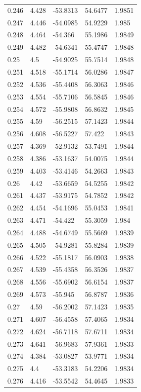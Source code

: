 \begin{tabular}{lllll}
0.246 & 4.428 & -53.8313 & 54.6477 & 1.9851 \\
0.247 & 4.446 & -54.0985 & 54.9229 & 1.985 \\
0.248 & 4.464 & -54.366 & 55.1986 & 1.9849 \\
0.249 & 4.482 & -54.6341 & 55.4747 & 1.9848 \\
0.25 & 4.5 & -54.9025 & 55.7514 & 1.9848 \\
0.251 & 4.518 & -55.1714 & 56.0286 & 1.9847 \\
0.252 & 4.536 & -55.4408 & 56.3063 & 1.9846 \\
0.253 & 4.554 & -55.7106 & 56.5845 & 1.9846 \\
0.254 & 4.572 & -55.9808 & 56.8632 & 1.9845 \\
0.255 & 4.59 & -56.2515 & 57.1423 & 1.9844 \\
0.256 & 4.608 & -56.5227 & 57.422 & 1.9843 \\
0.257 & 4.369 & -52.9132 & 53.7491 & 1.9844 \\
0.258 & 4.386 & -53.1637 & 54.0075 & 1.9844 \\
0.259 & 4.403 & -53.4146 & 54.2663 & 1.9843 \\
0.26 & 4.42 & -53.6659 & 54.5255 & 1.9842 \\
0.261 & 4.437 & -53.9175 & 54.7852 & 1.9842 \\
0.262 & 4.454 & -54.1696 & 55.0453 & 1.9841 \\
0.263 & 4.471 & -54.422 & 55.3059 & 1.984 \\
0.264 & 4.488 & -54.6749 & 55.5669 & 1.9839 \\
0.265 & 4.505 & -54.9281 & 55.8284 & 1.9839 \\
0.266 & 4.522 & -55.1817 & 56.0903 & 1.9838 \\
0.267 & 4.539 & -55.4358 & 56.3526 & 1.9837 \\
0.268 & 4.556 & -55.6902 & 56.6154 & 1.9837 \\
0.269 & 4.573 & -55.945 & 56.8787 & 1.9836 \\
0.27 & 4.59 & -56.2002 & 57.1423 & 1.9835 \\
0.271 & 4.607 & -56.4558 & 57.4065 & 1.9834 \\
0.272 & 4.624 & -56.7118 & 57.6711 & 1.9834 \\
0.273 & 4.641 & -56.9683 & 57.9361 & 1.9833 \\
0.274 & 4.384 & -53.0827 & 53.9771 & 1.9834 \\
0.275 & 4.4 & -53.3183 & 54.2206 & 1.9834 \\
0.276 & 4.416 & -53.5542 & 54.4645 & 1.9833 \\

\end{tabular}
